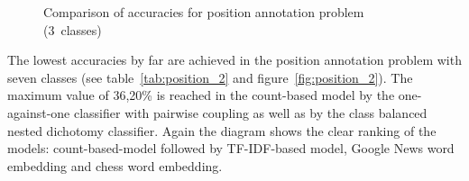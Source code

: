 \documentclass[article,type=msc,colorback,accentcolor=tud7b]{tudthesis}
\begin{document}
\begin{figure}[H]
\begin{floatrow}
{      }{%
	    \caption{Comparison of accuracies for position annotation problem (3~classes)}
        \label{fig:position_1}
      }
      \end{floatrow}
    \end{figure}

The lowest accuracies by far are achieved in the position annotation problem with seven classes (see table~\ref{tab:position_2} and figure~\ref{fig:position_2}). The maximum value of 36,20\% is reached in the count-based model by the one-against-one classifier with pairwise coupling as well as by the class balanced nested dichotomy classifier. Again the diagram shows the clear ranking of the models: count-based-model followed by TF-IDF-based model, Google News word embedding and chess word embedding.

    \begin{figure}[H]
      \begin{floatrow}
      \ffigbox[8.5cm]{%
}
\end{floatrow}
\end{figure}
\end{document}
